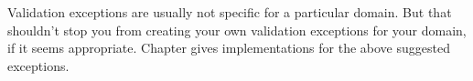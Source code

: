 Validation exceptions are usually not specific for a particular domain. But that shouldn't stop you from creating your own validation exceptions for your domain, if it seems appropriate. Chapter  gives implementations for the above suggested exceptions.


